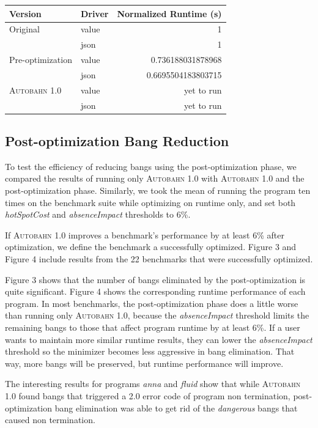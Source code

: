 \documentclass[format=sigplan]{acmart}
\newcommand{\hotspotcost}[0]{\textit{hotSpotCost}}
\newcommand{\dangerous}[0]{\textit{dangerous}}
\newcommand{\Ao}[0]{\textsc{Autobahn 1.0}}
\newcommand{\postopt}[0]{post-optimization}
\newcommand{\Postopt}[0]{Post-optimization}
\newcommand{\absim}[0]{\textit{absenceImpact}}
\begin{document}
\begin{tabular}{llr}
\hline
Version   & Driver & Normalized Runtime (s) \\
\hline
Original      & value   & 1     \\
          & json        & 1      \\
Pre-optimization       & value     & 0.736188031878968     \\
          & json        & 0.6695504183803715	\\
\Ao{}       & value     & yet to run      \\
          & json        & yet to run	\\

\hline
\end{tabular}

\subsection{\Postopt{} Bang Reduction}

To test the efficiency of reducing bangs using the \postopt{} phase, we compared the results of running only \Ao{} with \Ao{} and the \postopt{} phase. Similarly, we took the mean of running the program ten times on the benchmark suite while optimizing on runtime only, and set both \hotspotcost{} and \absim{} thresholds to 6\%. 

If \Ao{} improves a benchmark's performance by at least 6\% after optimization, we define the benchmark a successfully optimized. Figure 3 and Figure 4 include results from the 22 benchmarks that were successfully optimized. 

Figure 3 shows that the number of bangs eliminated by the \postopt{} is quite significant. Figure 4 shows the corresponding runtime performance of each program. In most benchmarks, the \postopt{} phase does a little worse than running only \Ao{}, because the \absim{} threshold limits the remaining bangs to those that affect program runtime by at least 6\%. If a user wants to maintain more similar runtime results, they can lower the \absim{} threshold so the minimizer becomes less aggressive in bang elimination. That way, more bangs will be preserved, but runtime performance will improve. 

The interesting results for programs \textit{anna} and \textit{fluid} show that while \Ao{} found bangs that triggered a 2.0 error code of program non termination, \postopt{} bang elimination was able to get rid of the \dangerous{} bangs that caused non termination.
\end{document}
